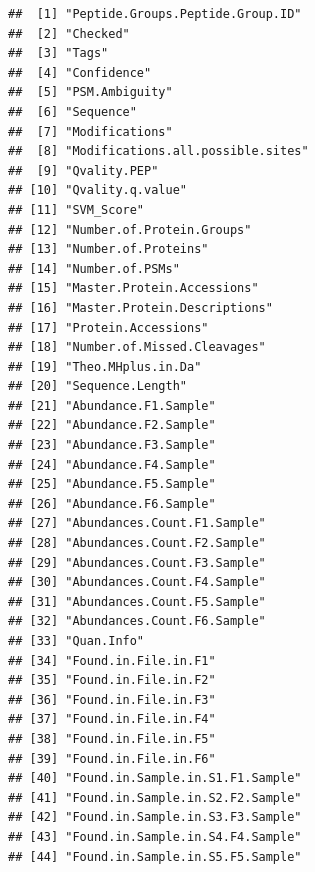 \documentclass[9pt,a4paper,]{extarticle}
\begin{document}
\begin{verbatim}
##  [1] "Peptide.Groups.Peptide.Group.ID"                
##  [2] "Checked"                                        
##  [3] "Tags"                                           
##  [4] "Confidence"                                     
##  [5] "PSM.Ambiguity"                                  
##  [6] "Sequence"                                       
##  [7] "Modifications"                                  
##  [8] "Modifications.all.possible.sites"               
##  [9] "Qvality.PEP"                                    
## [10] "Qvality.q.value"                                
## [11] "SVM_Score"                                      
## [12] "Number.of.Protein.Groups"                       
## [13] "Number.of.Proteins"                             
## [14] "Number.of.PSMs"                                 
## [15] "Master.Protein.Accessions"                      
## [16] "Master.Protein.Descriptions"                    
## [17] "Protein.Accessions"                             
## [18] "Number.of.Missed.Cleavages"                     
## [19] "Theo.MHplus.in.Da"                              
## [20] "Sequence.Length"                                
## [21] "Abundance.F1.Sample"                            
## [22] "Abundance.F2.Sample"                            
## [23] "Abundance.F3.Sample"                            
## [24] "Abundance.F4.Sample"                            
## [25] "Abundance.F5.Sample"                            
## [26] "Abundance.F6.Sample"                            
## [27] "Abundances.Count.F1.Sample"                     
## [28] "Abundances.Count.F2.Sample"                     
## [29] "Abundances.Count.F3.Sample"                     
## [30] "Abundances.Count.F4.Sample"                     
## [31] "Abundances.Count.F5.Sample"                     
## [32] "Abundances.Count.F6.Sample"                     
## [33] "Quan.Info"                                      
## [34] "Found.in.File.in.F1"                            
## [35] "Found.in.File.in.F2"                            
## [36] "Found.in.File.in.F3"                            
## [37] "Found.in.File.in.F4"                            
## [38] "Found.in.File.in.F5"                            
## [39] "Found.in.File.in.F6"                            
## [40] "Found.in.Sample.in.S1.F1.Sample"                
## [41] "Found.in.Sample.in.S2.F2.Sample"                
## [42] "Found.in.Sample.in.S3.F3.Sample"                
## [43] "Found.in.Sample.in.S4.F4.Sample"                
## [44] "Found.in.Sample.in.S5.F5.Sample"                

\end{verbatim}
\end{document}
